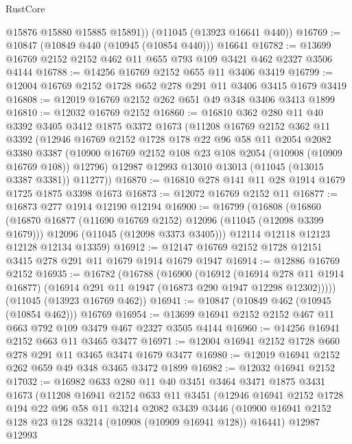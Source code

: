 \begin{lexlean}{RustCore}
\begin{coremodule}
        @15876
        @15880
        @15885
        @15891))
    (@11045 (@13923 @16641 @440))
@16769 := @10847 (@10849 @440 (@10945 (@10854 @440))) @16641
@16782 := @13699 @16769 @2152 @2152 @462 @11 @655 @793 @109 @3421 @462 @2327 @3506 @4144
@16788 := @14256 @16769 @2152 @655 @11 @3406 @3419
@16799 := @12004 @16769 @2152 @1728 @652 @278 @291 @11 @3406 @3415 @1679 @3419
@16808 := @12019 @16769 @2152 @262 @651 @49 @348 @3406 @3413 @1899
@16810 := @12032 @16769 @2152
@16860 := @16810
    @362
    @280
    @11
    @40
    @3392
    @3405
    @3412
    @1875
    @3372
    @1673
    (@11208
      @16769
      @2152
      @362
      @11
      @3392
      (@12946
        @16769
        @2152
        @1728
        @178
        @22
        @96
        @58
        @11
        @2054
        @2082
        @3380
        @3387
        (@10900 @16769 @2152 @108 @23 @108 @2054 (@10908 (@10909 @16769 @108)) @12796)
        @12987
        @12993
        @13010
        @13013
        (@11045 (@13015 @3387 @3381))
        @11277))
@16870 := @16810 @278 @141 @11 @28 @1914 @1679 @1725 @1875 @3398 @1673
@16873 := @12072 @16769 @2152 @11
@16877 := @16873 @277 @1914 @12190 @12194
@16900 := @16799
    (@16808
      (@16860
        (@16870 @16877 (@11690 @16769 @2152) @12096 (@11045 (@12098 @3399 @1679)))
        @12096
        (@11045 (@12098 @3373 @3405)))
      @12114
      @12118
      @12123
      @12128
      @12134
      @13359)
@16912 := @12147 @16769 @2152 @1728 @12151 @3415 @278 @291 @11 @1679 @1914 @1679 @1947
@16914 := @12886 @16769 @2152
@16935 := @16782
    (@16788
      (@16900
        (@16912
          (@16914 @278 @11 @1914 @16877)
          (@16914 @291 @11 @1947 (@16873 @290 @1947 @12298 @12302)))))
    (@11045 (@13923 @16769 @462))
@16941 := @10847 (@10849 @462 (@10945 (@10854 @462))) @16769
@16954 := @13699 @16941 @2152 @2152 @467 @11 @663 @792 @109 @3479 @467 @2327 @3505 @4144
@16960 := @14256 @16941 @2152 @663 @11 @3465 @3477
@16971 := @12004 @16941 @2152 @1728 @660 @278 @291 @11 @3465 @3474 @1679 @3477
@16980 := @12019 @16941 @2152 @262 @659 @49 @348 @3465 @3472 @1899
@16982 := @12032 @16941 @2152
@17032 := @16982
    @633
    @280
    @11
    @40
    @3451
    @3464
    @3471
    @1875
    @3431
    @1673
    (@11208
      @16941
      @2152
      @633
      @11
      @3451
      (@12946
        @16941
        @2152
        @1728
        @194
        @22
        @96
        @58
        @11
        @3214
        @2082
        @3439
        @3446
        (@10900 @16941 @2152 @128 @23 @128 @3214 (@10908 (@10909 @16941 @128)) @16441)
        @12987
        @12993

\end{coremodule}
\end{lexlean}
